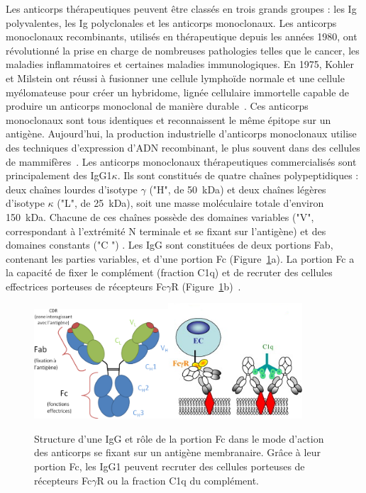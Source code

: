 Les anticorps thérapeutiques peuvent être classés en trois grands groupes : les Ig polyvalentes, les Ig polyclonales et les anticorps monoclonaux. Les anticorps monoclonaux recombinants, utilisés en thérapeutique depuis les années 1980, ont révolutionné la prise en charge de nombreuses pathologies telles que le cancer, les maladies inflammatoires et certaines maladies immunologiques. En 1975, Kohler et Milstein ont réussi à fusionner une cellule lymphoïde normale et une cellule myélomateuse pour créer un hybridome, lignée cellulaire immortelle capable de produire un anticorps monoclonal de manière durable~\citep{REF13}. Ces anticorps monoclonaux sont tous identiques et reconnaissent le même épitope sur un antigène. Aujourd'hui, la production industrielle d'anticorps monoclonaux utilise des techniques d'expression d'ADN recombinant, le plus souvent dans des cellules de mammifères~\citep{REF14, REF15}. Les anticorps monoclonaux thérapeutiques commercialisés sont principalement des IgG1$\kappa$. Ils sont constitués de quatre chaînes polypeptidiques : deux chaînes lourdes d'isotype $\gamma$ ("H", de 50~k\gls{Da}) et deux chaînes légères d'isotype $\kappa$ ("L", de 25~k\gls{Da}), soit une masse moléculaire totale d'environ 150~k\gls{Da}. Chacune de ces chaînes possède des domaines variables ("V", correspondant à l'extrémité N terminale et se fixant sur l'antigène) et des domaines constants ("C ") . Les IgG sont constituées de deux portions Fab, contenant les parties variables, et d'une portion Fc (Figure~\ref{fig:11}a). La portion Fc a la capacité de fixer le complément (fraction C1q) et de recruter des cellules effectrices porteuses de récepteurs Fc$\gamma$R (Figure~\ref{fig:11}b)~\citep{REF16}.

\begin{figure}[htbp]
	\centering
		\includegraphics[width=5cm]{figures/raster/FIG_11a}\includegraphics[width=5cm]{figures/raster/FIG_11b}
	\caption[Structure d'une IgG et rôle de la portion Fc.]{Structure d'une IgG et rôle de la portion Fc dans le mode d'action des anticorps se fixant sur un antigène membranaire. Grâce à leur portion Fc, les IgG1 peuvent recruter des cellules porteuses de récepteurs Fc$\gamma$R ou la fraction C1q du complément.}
	\label{fig:11}
\end{figure}

